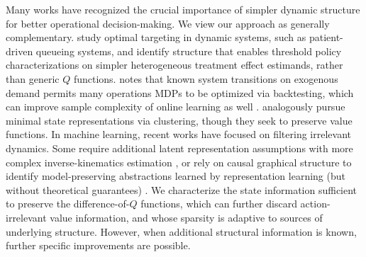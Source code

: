 \documentclass[opre,nonblindrev]{informs4}
\begin{document}
Many works have recognized the crucial importance of simpler dynamic structure for better operational decision-making. We view our approach as generally complementary. \citet{hu2025optimal} study optimal targeting in dynamic systems, such as patient-driven queueing systems, and identify structure that enables threshold policy characterizations on simpler heterogeneous treatment effect estimands, rather than generic $Q$ functions. \citet{sinclair2023hindsight} notes that known system transitions on exogenous demand permits many operations MDPs to be optimized via backtesting, which can improve sample complexity of online learning as well \citep{wan2024exploiting,zhang2025reinforcement}. \citet{bennouna2025learning} analogously pursue minimal state representations via clustering, though they seek to preserve value functions. In machine learning, recent works have focused on filtering irrelevant dynamics. Some require additional latent representation assumptions with more complex inverse-kinematics estimation \citep{efroni2021provably,efroni2022sparsity}, or rely on causal graphical structure to identify model-preserving abstractions learned by representation learning (but without theoretical guarantees) \citep{wang2021task,wang2022denoised,liu2023}. We characterize the state information sufficient to preserve the difference-of-$Q$ functions, which can further discard action-irrelevant value information, and whose sparsity is adaptive to sources of underlying structure. However, when additional structural information is known, further specific improvements are possible. 
\end{document}
